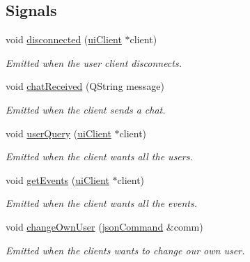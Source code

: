 \subsection*{Signals}
\begin{DoxyCompactItemize}
\item 
void \hyperlink{classserver_1_1ui_client_a3d11b3850540e70abe814f3a3831a5f5}{disconnected} (\hyperlink{classserver_1_1ui_client}{ui\-Client} $\ast$client)
\begin{DoxyCompactList}\small\item\em Emitted when the user client disconnects. \end{DoxyCompactList}\item 
void \hyperlink{classserver_1_1ui_client_a970bb30d534e08d2537e2ef495ad7427}{chat\-Received} (Q\-String message)
\begin{DoxyCompactList}\small\item\em Emitted when the client sends a chat. \end{DoxyCompactList}\item 
void \hyperlink{classserver_1_1ui_client_a334fdbafee59c9007c38466550572d83}{user\-Query} (\hyperlink{classserver_1_1ui_client}{ui\-Client} $\ast$client)
\begin{DoxyCompactList}\small\item\em Emitted when the client wants all the users. \end{DoxyCompactList}\item 
void \hyperlink{classserver_1_1ui_client_a06de500dff0e31a8367b1988e2a0b414}{get\-Events} (\hyperlink{classserver_1_1ui_client}{ui\-Client} $\ast$client)
\begin{DoxyCompactList}\small\item\em Emitted when the client wants all the events. \end{DoxyCompactList}\item 
void \hyperlink{classserver_1_1ui_client_af31e3f327761e528ddabb232d1224620}{change\-Own\-User} (\hyperlink{class_k4_u_1_1json_command}{json\-Command} \&comm)
\begin{DoxyCompactList}\small\item\em Emitted when the clients wants to change our own user. \end{DoxyCompactList}\end{DoxyCompactItemize}
